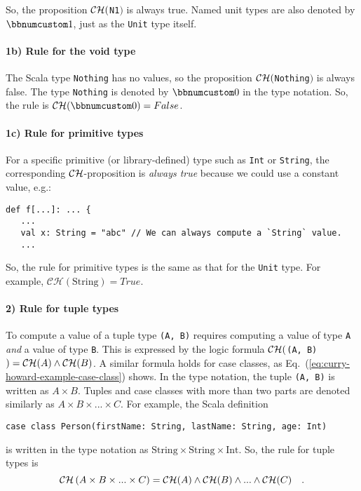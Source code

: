 \noindent So, the proposition ${\cal CH}($\lstinline!N1!$)$ is
always true. Named unit types are also denoted by $\bbnum 1$, just
as the \lstinline!Unit! type itself.

\paragraph{1b) Rule for the void type}

The Scala type \lstinline!Nothing! has no values, so the proposition
${\cal CH}($\lstinline!Nothing!$)$ is always false. The type \lstinline!Nothing!
is denoted by $\bbnum 0$ in the type notation. So, the rule is $\mathcal{CH}(\bbnum 0)=False$.

\paragraph{1c) Rule for primitive types}

For a specific primitive (or library-defined) type such as \lstinline!Int!
or \lstinline!String!, the corresponding ${\cal CH}$-proposition
is \emph{always true} because we could use a constant value, e.g.:
\begin{lstlisting}
def f[...]: ... {
   ...
   val x: String = "abc" // We can always compute a `String` value.
   ...
\end{lstlisting}
So, the rule for primitive types is the same as that for the \lstinline!Unit!
type. For example, $\mathcal{CH}(\text{String})=True$.

\paragraph{2) Rule for tuple types}

To compute a value of a tuple type \lstinline!(A, B)! requires computing
a value of type \lstinline!A! \emph{and} a value of type \lstinline!B!.
This is expressed by the logic formula ${\cal CH}($\lstinline!(A, B)!$)={\cal CH}(A)\wedge{\cal CH}(B)$.
A similar formula holds for case classes, as Eq.~(\ref{eq:curry-howard-example-case-class})
shows. In the type notation, the tuple \lstinline!(A, B)! is written
as $A\times B$. Tuples and case classes with more than two parts
are denoted similarly as $A\times B\times...\times C$. For example,
the Scala definition
\begin{lstlisting}
case class Person(firstName: String, lastName: String, age: Int)
\end{lstlisting}
is written in the type notation as $\text{String}\times\text{String}\times\text{Int}$.
So, the rule for tuple types is
\[
{\cal CH}\left(A\times B\times...\times C\right)={\cal CH}(A)\wedge{\cal CH}(B)\wedge...\wedge{\cal CH}(C)\quad.
\]


